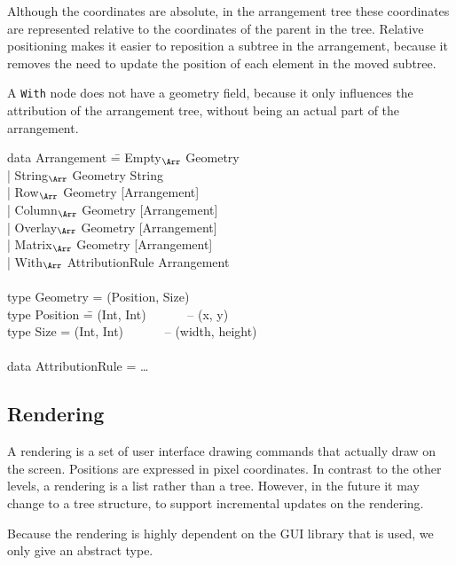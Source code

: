 
Although the coordinates are absolute, in the arrangement tree these coordinates are represented relative to the coordinates of the parent in the tree. Relative positioning makes it easier to reposition a subtree in the arrangement, because it removes the need to update the position of each element in the moved subtree. 

A \verb|With| node does not have a geometry field, because it only influences the attribution of the arrangement tree, without being an actual part of the arrangement. 
\ttfamily
\begin{tabbing}
data Arrangement \= = Empty$_{\Arr}$ Geometry\\
                 \> | String$_{\Arr}$ Geometry String\\
                 \> | Row$_{\Arr}$ Geometry [Arrangement]\\
                 \> | Column$_{\Arr}$ Geometry [Arrangement]\\
                 \> | Overlay$_{\Arr}$ Geometry [Arrangement]\\
                 \> | Matrix$_{\Arr}$ Geometry [Arrangement]\\
                 \> | With$_{\Arr}$ AttributionRule Arrangement\\
\\
type Geometry = (Position, Size)\\
type Position \= = (Int, Int)  ~~~~~~-- (x,  y)\\
type Size      \> = (Int, Int)  ~~~~~~-- (width, height)\\
\\
data AttributionRule = \dots\\
\end{tabbing}
\rmfamily

%																
\subsection{Rendering}

A rendering is a set of user interface drawing commands that actually draw on the screen. Positions are expressed in pixel coordinates. In contrast to the other levels, a rendering is a list rather than a tree. However, in the future it may change to a tree structure, to support incremental updates on the rendering. 

Because the rendering is highly dependent on the GUI library that is used, we only give an abstract type.

